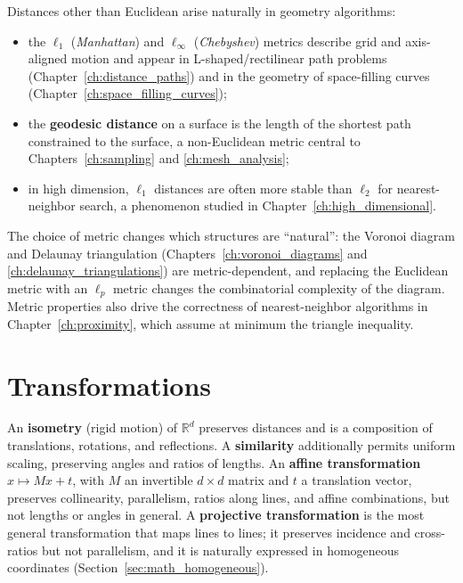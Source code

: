Distances other than Euclidean arise naturally in geometry algorithms:
\begin{itemize}
  \item the $\ell_1$ (\emph{Manhattan}) and $\ell_\infty$ (\emph{Chebyshev})
    metrics describe grid and axis-aligned motion and appear in
    L-shaped/rectilinear path problems (Chapter~\ref{ch:distance_paths}) and
    in the geometry of space-filling curves (Chapter~\ref{ch:space_filling_curves});
  \item the \textbf{geodesic distance} on a surface is the length of the
    shortest path constrained to the surface, a non-Euclidean metric central
    to Chapters~\ref{ch:sampling} and \ref{ch:mesh_analysis};
  \item in high dimension, $\ell_1$ distances are often more stable than
    $\ell_2$ for nearest-neighbor search, a phenomenon studied in
    Chapter~\ref{ch:high_dimensional}.
\end{itemize}

The choice of metric changes which structures are ``natural'': the Voronoi
diagram and Delaunay triangulation (Chapters~\ref{ch:voronoi_diagrams} and
\ref{ch:delaunay_triangulations}) are metric-dependent, and replacing the
Euclidean metric with an $\ell_p$ metric changes the combinatorial
complexity of the diagram. Metric properties also drive the correctness of
nearest-neighbor algorithms in Chapter~\ref{ch:proximity}, which assume at
minimum the triangle inequality.


\section{Transformations}
\label{sec:math_transformations}

An \textbf{isometry} (rigid motion) of $\mathbb{R}^d$ preserves distances
and is a composition of translations, rotations, and reflections. A
\textbf{similarity} additionally permits uniform scaling, preserving angles
and ratios of lengths. An \textbf{affine transformation}
$x \mapsto Mx + t$, with $M$ an invertible $d\times d$ matrix and $t$ a
translation vector, preserves collinearity, parallelism, ratios along lines,
and affine combinations, but not lengths or angles in general. A
\textbf{projective transformation} is the most general transformation that
maps lines to lines; it preserves incidence and cross-ratios but not
parallelism, and it is naturally expressed in homogeneous coordinates
(Section~\ref{sec:math_homogeneous}).

